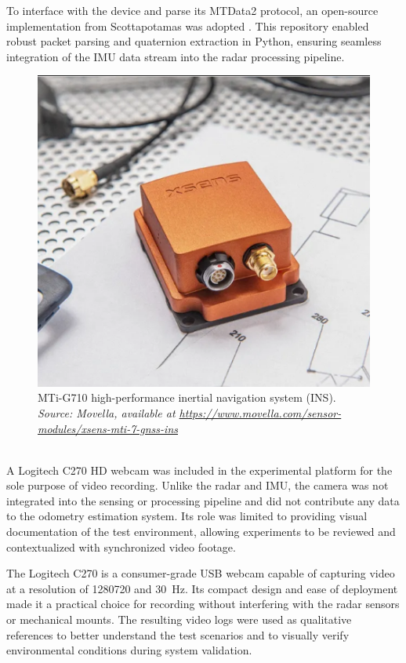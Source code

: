 To interface with the device and parse its MTData2 protocol, an open-source implementation from Scottapotamas was adopted \cite{xsens_repo}.  
This repository enabled robust packet parsing and quaternion extraction in Python, ensuring seamless integration of the IMU data stream into the radar processing pipeline.  

\begin{figure}[!htbp]
    \centering
    \includegraphics[width=1.0\linewidth]{images/mti_g710.png}
    \caption{MTi-G710 high-performance inertial navigation system (INS).\\
    \textit{Source: Movella, available at \url{https://www.movella.com/sensor-modules/xsens-mti-7-gnss-ins}}}
    \label{fig:MTi-G710 sensor}
\end{figure}

\hfill
\\
A Logitech C270 HD webcam was included in the experimental platform for the sole purpose of video recording.  
Unlike the radar and IMU, the camera was not integrated into the sensing or processing pipeline and did not contribute any data to the odometry estimation system.  
Its role was limited to providing visual documentation of the test environment, allowing experiments to be reviewed and contextualized with synchronized video footage.  

The Logitech C270 is a consumer-grade USB webcam capable of capturing video at a resolution of \SI{1280}{\times}\SI{720}{} and \SI{30}{\hertz}.  
Its compact design and ease of deployment made it a practical choice for recording without interfering with the radar sensors or mechanical mounts.  
The resulting video logs were used as qualitative references to better understand the test scenarios and to visually verify environmental conditions during system validation.  
